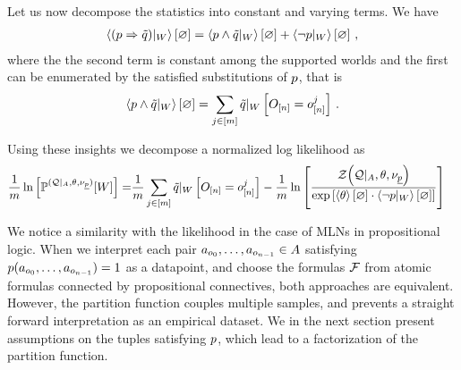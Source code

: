 Let us now decompose the statistics into constant and varying terms.
We have
\begin{align*}
	\left\langle {(p\Rightarrow\tilde{q})}|_{W}\right\rangle \left[ \varnothing \right] = 
		\left\langle {p\land\tilde{q}}|_{W}\right\rangle \left[ \varnothing \right] + \left\langle {\lnot p}|_{W}\right\rangle \left[ \varnothing \right] \, ,
\end{align*}
where the the second term is constant among the supported worlds and the first can be enumerated by the satisfied substitutions of $p$, that is
\begin{align*}
	\left\langle {p\land\tilde{q}}|_{W}\right\rangle \left[ \varnothing \right] 
	= \sum_{j\in[m]}{\tilde{q}}|_{W} \left[O_{[n]} = o_{[n]}^{j}\right] \, .
\end{align*}


Using these insights we decompose a normalized log likelihood as
\begin{align}\label{eq:dataworldLogProb}
	\frac{1}{m} \ln \left[ \mathbb{P}^{(\mathcal{Q} |_{A},\theta , \nu_{\underline{p}})} [W] \right]
	= & \frac{1}{m} \sum_{j\in[m]} {\tilde{q}}|_{W} \left[O_{[n]} = o_{[n]}^{j}\right]
	- \frac{1}{m} \ln \left[ 
		\frac{\mathcal{Z}{\left(\mathcal{Q} |_{A},\theta , \nu_{\underline{p}}\right)}}{
			\mathrm{exp}\left[\left\langle \theta\right\rangle \left[ \varnothing \right] \cdot \left\langle {\lnot p}|_{W}\right\rangle \left[ \varnothing \right]\right]
		}
	 \right]
\end{align} 

We notice a similarity with the likelihood in the case of MLNs in propositional logic.
When we interpret each pair $a_{o_{0}},\ldots,a_{o_{n-1}}\in A$ satisfying $p(a_{o_{0}},\ldots,a_{o_{n-1}})=1$ as a datapoint, and choose the formulas $\mathcal{F}$ from atomic formulas connected by propositional connectives, both approaches are equivalent.
However, the partition function couples multiple samples, and prevents a straight forward interpretation as an empirical dataset.
We in the next section present assumptions on the tuples satisfying $p$, which lead to a factorization of the partition function.




